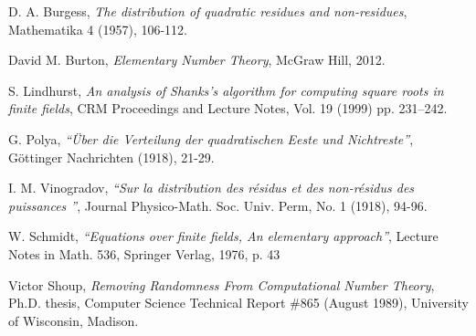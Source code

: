 \documentclass{report}
\begin{document}
%
%
\begin{thebibliography}{9}

 D. A. Burgess,
\textit{The distribution of quadratic residues and non-residues},
Mathematika 4 (1957), 106-112.

David M. Burton, \textit{Elementary Number Theory},
McGraw Hill, 2012.

S. Lindhurst, \textit{An analysis of Shanks's algorithm for computing square roots in finite fields},
CRM Proceedings and Lecture Notes, Vol. 19 (1999) pp. 231–242.

G. Polya,
\textit{``{\"U}ber die Verteilung der quadratischen Eeste und Nichtreste''},
G{\"o}ttinger Nachrichten (1918), 21-29.

I. M. Vinogradov,
\textit{``Sur la distribution des r{\'e}sidus et des non-r{\'e}sidus des puissances ''},
Journal Physico-Math. Soc. Univ. Perm, No. 1 (1918), 94-96.

W. Schmidt,
\textit{``Equations over finite fields, An elementary approach''},
Lecture Notes in Math. 536, Springer Verlag, 1976, p. 43

 Victor Shoup,
\textit{Removing Randomness From Computational Number Theory}, Ph.D. thesis,
Computer Science Technical Report \#865 (August 1989), University of Wisconsin, Madison.

\end{thebibliography}
%
\end{document}
